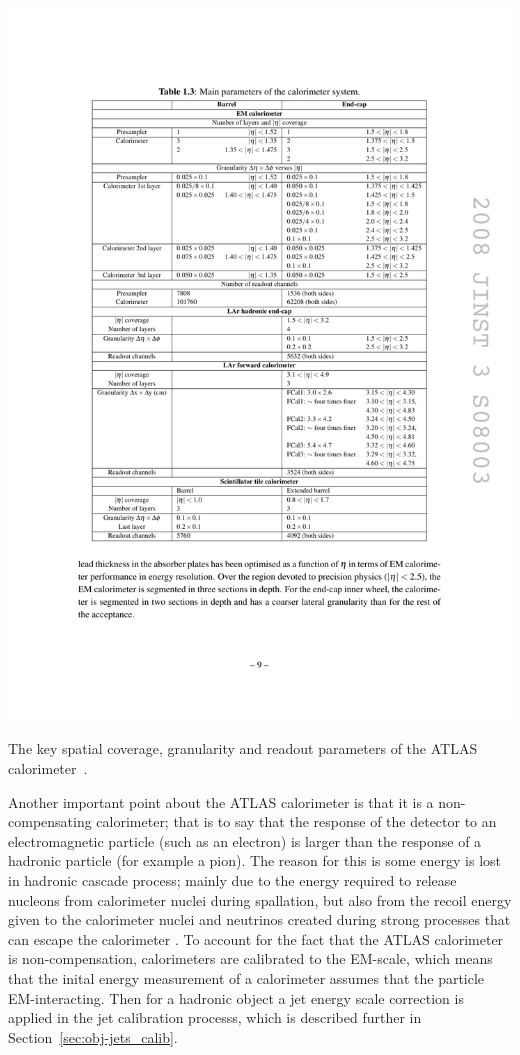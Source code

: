 \begin{table}[!ht]
  \begin{center}
    \includegraphics[width=1\linewidth, angle=0]{figs/Detector/tab_calo_granularity.pdf}
  \end{center}
  \caption[The key spatial coverage, granularity and readout parameters of the ATLAS calorimeter.]
          {The key spatial coverage, granularity and readout parameters of the ATLAS calorimeter~\cite{det-ATLAS_Exp}.}
  \label{tab:det-calo_granularity}
\end{table}

Another important point about the ATLAS calorimeter is that it is a non-compensating calorimeter;
that is to say that the response of the detector to an electromagnetic particle (such as an electron)
is larger than the response of a hadronic particle (for example a pion).
The reason for this is some energy is lost in hadronic cascade process;
mainly due to the energy required to release nucleons from calorimeter nuclei during spallation,
but also from the recoil energy given to the calorimeter nuclei
and neutrinos created during strong processes that can escape the calorimeter \cite{det-comp_calo, det-thesis_lene}.
To account for the fact that the ATLAS calorimeter is non-compensation,
calorimeters are calibrated to the EM-scale,
which means that the inital energy measurement of a calorimeter assumes that the particle EM-interacting.
Then for a hadronic object a jet energy scale correction is applied in the jet calibration processs,
which is described further in Section~\ref{sec:obj-jets_calib}.

